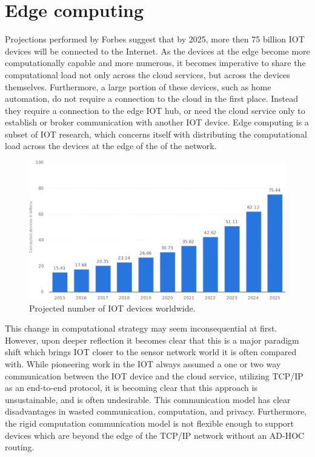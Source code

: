 \section{Edge computing}
Projections performed by Forbes suggest that by 2025, more then 75 billion IOT devices will be connected to the Internet.\cite{forbesiot} As the devices at the edge become more computationally capable and more numerous, it becomes imperative to share the computational load not only across the cloud services, but across the devices themselves. Furthermore, a large portion of these devices, such as home automation, do not require a connection to the cloud in the first place. Instead they require a connection to the edge IOT hub, or need the cloud service only to establish or broker communication with another IOT device. Edge computing is a subset of IOT research, which concerns itself with distributing the computational load across the devices at the edge of the of the network. \cite{satyanarayanan2017emergence}
\begin{figure}[h]
	\centering
	\includegraphics[width=0.8\linewidth]{img/iot_statistics.pdf}	
	\caption{Projected number of IOT devices worldwide.\cite{forbesiot}}
	\label{lit:fig:1}
\end{figure}

This change in computational strategy may seem inconsequential at first. However, upon deeper reflection it becomes clear that this is a major paradigm shift which brings IOT closer to the sensor network world it is often compared with. While pioneering work in the IOT always assumed a one or two way communication between the IOT device and the cloud service, utilizing TCP/IP as an end-to-end protocol, it is becoming clear that this approach is unsustainable, and is often undesirable. This communication model has clear disadvantages in wasted communication, computation, and privacy. Furthermore, the rigid computation communication model is not flexible enough to support devices which are beyond the edge of the TCP/IP network without an AD-HOC routing. \cite{gagliardi2011content}

